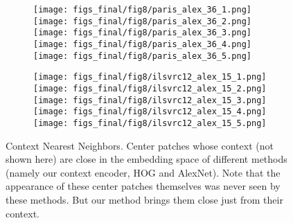 \documentclass[10pt,twocolumn,letterpaper]{article}
\newcommand{\lblfig}[1]{\label{fig:#1}}
\begin{document}
\begin{figure*}[t]
\begin{subfigure}[b]{0.5\linewidth}
\end{subfigure}
\begin{subfigure}[b]{0.5\linewidth}
\centering
{}\;
\texttt{[image: figs\_final/fig8/paris\_alex\_36\_1.png]}
\texttt{[image: figs\_final/fig8/paris\_alex\_36\_2.png]}
\texttt{[image: figs\_final/fig8/paris\_alex\_36\_3.png]}
\texttt{[image: figs\_final/fig8/paris\_alex\_36\_4.png]}
\texttt{[image: figs\_final/fig8/paris\_alex\_36\_5.png]}
\end{subfigure}
\begin{subfigure}[b]{0.5\linewidth}
\centering
{}\;
\texttt{[image: figs\_final/fig8/ilsvrc12\_alex\_15\_1.png]}
\texttt{[image: figs\_final/fig8/ilsvrc12\_alex\_15\_2.png]}
\texttt{[image: figs\_final/fig8/ilsvrc12\_alex\_15\_3.png]}
\texttt{[image: figs\_final/fig8/ilsvrc12\_alex\_15\_4.png]}
\texttt{[image: figs\_final/fig8/ilsvrc12\_alex\_15\_5.png]}
\end{subfigure}
%
%
%
%
%
%
%
%
%
%
%
%
%
%
%
%
%
%
%
%
%
%
%
%
%
%
%
%
%
%
%
%
%
%
%
%
%
%
%
%
%
%
%
%
%
%
%
%
%
%
%
%
%
%
\vspace{-1em}
\caption{Context Nearest Neighbors. Center patches whose context (not shown here) are close in the embedding space of different methods (namely our context encoder, HOG and AlexNet).
Note that the appearance of these center patches themselves was never seen by these methods.
But our method brings them close just from their context.
}
\lblfig{nnpatches}
%
\end{figure*}
\end{document}
